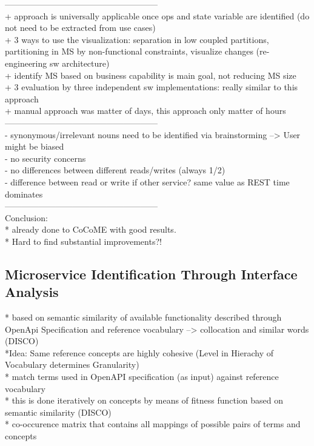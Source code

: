 ------------------------------------------------------\\
+ approach is universally applicable once ops and state variable are identified (do not need to be extracted from use cases) \\
+ 3 ways to use the visualization: separation in low coupled partitions, partitioning in MS by non-functional constraints, visualize changes (re-engineering sw architecture)\\
+ identify MS based on business capability is main goal, not reducing MS size\\
+ 3 evaluation by three independent sw implementations: really similar to this approach\\
+ manual approach was matter of days, this approach only matter of hours\\



------------------------------------------------------\\
- synonymous/irrelevant nouns need to be identified via brainstorming --> User might be biased\\
- no security concerns\\
- no differences between different reads/writes (always 1/2)\\
- difference between read or write if other service? same value as REST time dominates \\



------------------------------------------------------\\
Conclusion:\\
* already done to CoCoME with good results. \\
* Hard to find substantial improvements?! \\

\subsection{Microservice Identification Through Interface Analysis}

* based on semantic similarity of available functionality described through OpenApi Specification and reference vocabulary --> collocation and similar words (DISCO)\\
*Idea: Same reference concepts are highly cohesive (Level in Hierachy of Vocabulary determines Granularity)\\
* match terms used in OpenAPI specification (as input) against reference vocabulary\\
* this is done iteratively on concepts by means of fitness function based on semantic similarity (DISCO)\\
* co-occurence matrix that contains all mappings of possible pairs of terms and concepts \\

